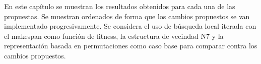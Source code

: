 En este capítulo se muestran los resultados obtenidos para cada una de las propuestas. Se muestran ordenados de forma que los cambios propuestos se van implementado progresivamente. Se considera el uso de búsqueda local iterada con el makespan como función de fitness, la estructura de vecindad N7 y la representación basada en permutaciones como caso base para comparar contra los cambios propuestos.
